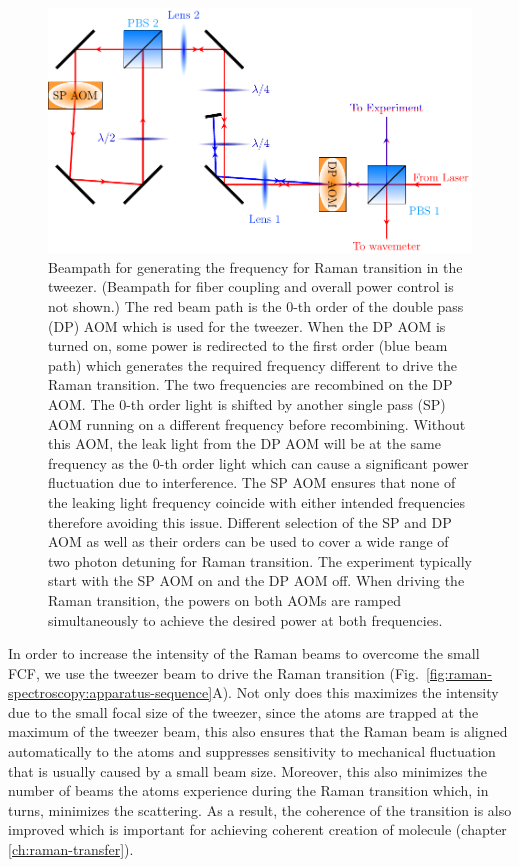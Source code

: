 \begin{figure}
  \centering
  \includegraphics[width=\textwidth]{figures/raman_spectroscopy_raman_beampath.pdf}
  \caption[Beampath to allow driving Raman transition with tweezer]{
    Beampath for generating the frequency for Raman transition in the tweezer.
    (Beampath for fiber coupling and overall power control is not shown.)
    The red beam path is the $0$-th order of the double pass (DP) AOM
    which is used for the tweezer.
    When the DP AOM is turned on, some power is redirected to the first order
    (blue beam path) which generates the required frequency different to drive
    the Raman transition. The two frequencies are recombined on the DP AOM.
    The $0$-th order light is shifted by another single pass (SP) AOM
    running on a different frequency before recombining.
    Without this AOM, the leak light from the DP AOM will be at the same frequency
    as the $0$-th order light which can cause a significant power fluctuation
    due to interference. The SP AOM ensures that none of the leaking light frequency
    coincide with either intended frequencies therefore avoiding this issue.
    Different selection of the SP and DP AOM as well as their orders can be used
    to cover a wide range of two photon detuning for Raman transition.
    The experiment typically start with the SP AOM on and the DP AOM off.
    When driving the Raman transition, the powers on both AOMs are ramped simultaneously
    to achieve the desired power at both frequencies.
    \label{fig:raman-spectroscopy:raman-beampath}}
\end{figure}

In order to increase the intensity of the Raman beams to overcome the small FCF,
we use the tweezer beam to drive the Raman transition
(Fig.~\ref{fig:raman-spectroscopy:apparatus-sequence}A).
Not only does this maximizes the intensity due to the small focal size of the tweezer,
since the atoms are trapped at the maximum of the tweezer beam,
this also ensures that the Raman beam is aligned automatically to the atoms
and suppresses sensitivity to mechanical fluctuation that is usually
caused by a small beam size.
Moreover, this also minimizes the number of beams the atoms experience
during the Raman transition which, in turns, minimizes the scattering.
As a result, the coherence of the transition is also improved
which is important for achieving coherent creation of molecule
(chapter \ref{ch:raman-transfer}).

